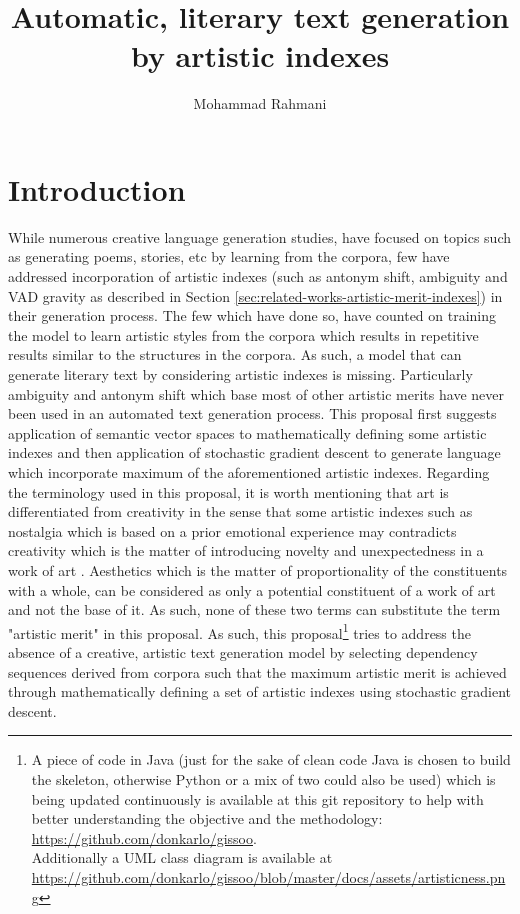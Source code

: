 \documentclass{article}
\begin{document}
	
	\title{Automatic, literary text generation by artistic indexes}
	\author{Mohammad Rahmani}
	\date{}
	\maketitle
	\section{Introduction}\label{sec:introduction}
	While numerous creative language generation studies, have focused on topics such as generating poems, stories, etc by learning from the corpora, few have addressed incorporation of artistic indexes (such as antonym shift, ambiguity and VAD gravity as  described in Section \ref{sec:related-works-artistic-merit-indexes}) in their generation process. The few which have done so, have counted on training the model to learn artistic styles from the corpora which results in repetitive results similar to the structures in the corpora. As such, a model that can generate literary text by considering artistic indexes is missing. Particularly ambiguity and antonym shift which base most of other artistic merits have never been used in an automated text generation process. This proposal first suggests application of semantic vector spaces to mathematically defining some artistic indexes and then application of stochastic gradient descent to generate language which incorporate maximum of the aforementioned artistic indexes. Regarding the terminology used in this proposal, it is worth mentioning that art is differentiated from creativity in the sense that some artistic indexes such as nostalgia which is based on a prior emotional experience may contradicts creativity which is the matter of introducing novelty and unexpectedness in a work of art \citep{jordanous-2012-a-standardised-procedure-for-evaluating-creative-systems-computational-creativity-evaluation-based-on-what-it-is-to-be-creative}. Aesthetics which is the matter of proportionality of the constituents with a whole, can be considered as only a potential constituent of a work of art and not the base of it. As such, none of these two terms can substitute the term "artistic merit" in this proposal.  As such, this proposal\footnote{A piece of code in Java (just for the sake of clean code Java is chosen to build the skeleton, otherwise Python or a mix of two could also be used) which is being updated continuously is available at this  git repository to help with better understanding the objective and the methodology: \\ \url{https://github.com/donkarlo/gissoo}. \\Additionally a UML class diagram is available at\\ \url{https://github.com/donkarlo/gissoo/blob/master/docs/assets/artisticness.png}} tries to address the absence of a creative, artistic text generation model by selecting dependency sequences derived from corpora such that the maximum artistic merit is achieved through mathematically defining a set of artistic indexes using stochastic gradient descent.      
	
\end{document}
